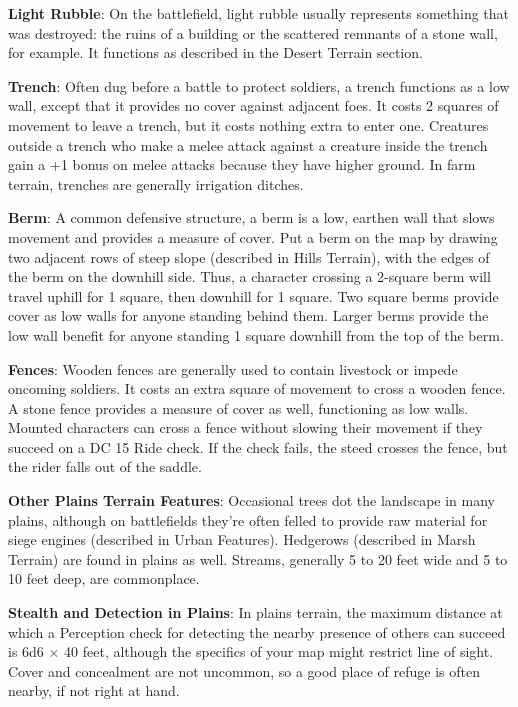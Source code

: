 \textbf{Light Rubble}: On the battlefield, light rubble usually represents something that was destroyed: the ruins of a building or the scattered remnants of a stone wall, for example. It functions as described in the Desert Terrain section.
				
\textbf{Trench}: Often dug before a battle to protect soldiers, a trench functions as a low wall, except that it provides no cover against adjacent foes. It costs 2 squares of movement to leave a trench, but it costs nothing extra to enter one. Creatures outside a trench who make a melee attack against a creature inside the trench gain a +1 bonus on melee attacks because they have higher ground. In farm terrain, trenches are generally irrigation ditches.
				
\textbf{Berm}: A common defensive structure, a berm is a low, earthen wall that slows movement and provides a measure of cover. Put a berm on the map by drawing two adjacent rows of steep slope (described in Hills Terrain), with the edges of the berm on the downhill side. Thus, a character crossing a 2-square berm will travel uphill for 1 square, then downhill for 1 square. Two square berms provide cover as low walls for anyone standing behind them. Larger berms provide the low wall benefit for anyone standing 1 square downhill from the top of the berm. 
				
\textbf{Fences}: Wooden fences are generally used to contain livestock or impede oncoming soldiers. It costs an extra square of movement to cross a wooden fence. A stone fence provides a measure of cover as well, functioning as low walls. Mounted characters can cross a fence without slowing their movement if they succeed on a DC 15 Ride check. If the check fails, the steed crosses the fence, but the rider falls out of the saddle.
				
\textbf{Other Plains Terrain Features}: Occasional trees dot the landscape in many plains, although on battlefields they're often felled to provide raw material for siege engines (described in Urban Features). Hedgerows (described in Marsh Terrain) are found in plains as well. Streams, generally 5 to 20 feet wide and 5 to 10 feet deep, are commonplace.
				
\textbf{Stealth and Detection in Plains}: In plains terrain, the maximum distance at which a Perception check for detecting the nearby presence of others can succeed is 6d6 \mbox{$\times$} 40 feet, although the specifics of your map might restrict line of sight. Cover and concealment are not uncommon, so a good place of refuge is often nearby, if not right at hand.
				
